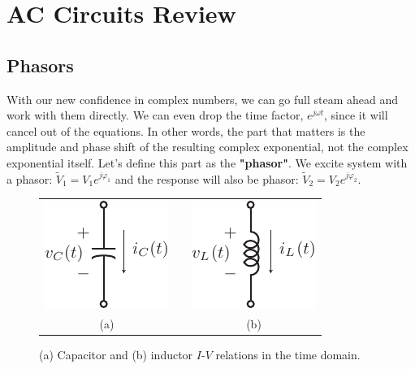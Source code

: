 \section{AC Circuits Review}
\subsection{Phasors}
With our new confidence in complex numbers, we can go full steam ahead and work with them directly.  We can even drop the time factor, $e^{j\omega t}$, since it will cancel out of the equations.  In other words, the part that matters is the amplitude and phase shift of the resulting complex exponential, not the complex exponential itself.  Let's define this part as the \textbf{"phasor"}.
We excite system with a phasor: ${\tilde V_1} = {V_1}{e^{j{\varphi _1}}}$ and the response  will also be phasor: ${\tilde V_2} = {V_2}{e^{j{\varphi _2}}}$.   
\begin{figure}[H]
\centering
\begin{tabular}{ccc}
\includegraphics[width=.35\columnwidth]{mod1_3_3_cap} & \hspace{1cm} &
\includegraphics[width=.35\columnwidth]{mod1_3_4_ind}\\
(a) & & (b)\\
\end{tabular}
\caption{(a) Capacitor and (b) inductor  $I$-$V$ relations in the time domain.}
\label{fig:lcphasor}
\end{figure}
